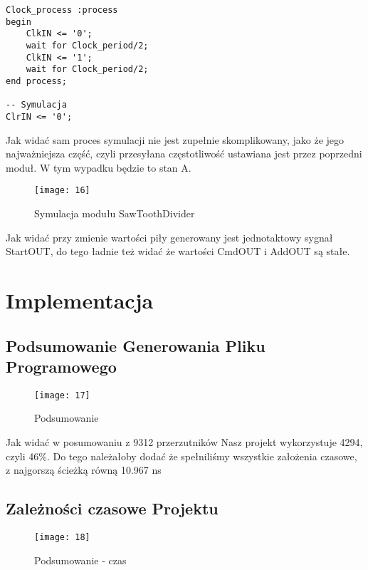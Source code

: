 \documentclass[11pt]{article}
\begin{document}
	\begin{lstlisting}[frame=single, caption={Test modułu SawToothDivider},captionpos=b]
Clock_process :process
begin
	ClkIN <= '0';
	wait for Clock_period/2;
	ClkIN <= '1';
	wait for Clock_period/2;
end process;
	
-- Symulacja
ClrIN <= '0';
	\end{lstlisting}
	
	Jak widać sam proces symulacji nie jest zupełnie skomplikowany, jako że jego najważniejsza część, czyli przesyłana częstotliwość ustawiana jest przez poprzedni moduł. W tym wypadku będzie to stan A.
	
	\begin{figure}[H]
		\centering
		\centerline{\texttt{[image: 16]}}
		\caption{Symulacja modułu SawToothDivider}
		\label{fig:11}
	\end{figure}
	
	Jak widać przy zmienie wartości piły generowany jest jednotaktowy sygnał StartOUT, do tego ładnie też widać że wartości CmdOUT i AddOUT są stałe.
	
	\section{Implementacja}
	\subsection{Podsumowanie Generowania Pliku Programowego}
	
	\begin{figure}[H]
		\centering
		\centerline{\texttt{[image: 17]}}
		\caption{Podsumowanie}
		\label{fig:11}
	\end{figure}
	
	Jak widać w posumowaniu z 9312 przerzutników Nasz projekt wykorzystuje 4294, czyli 46\%. Do tego należałoby dodać że spełniliśmy wszystkie założenia czasowe, z najgorszą ścieżką równą 10.967 ns
	
	\subsection{Zależności czasowe Projektu}
	
	\begin{figure}[H]
		\centering
		\centerline{\texttt{[image: 18]}}
		\caption{Podsumowanie - czas}
		\label{fig:11}
	\end{figure}
	
\end{document}

